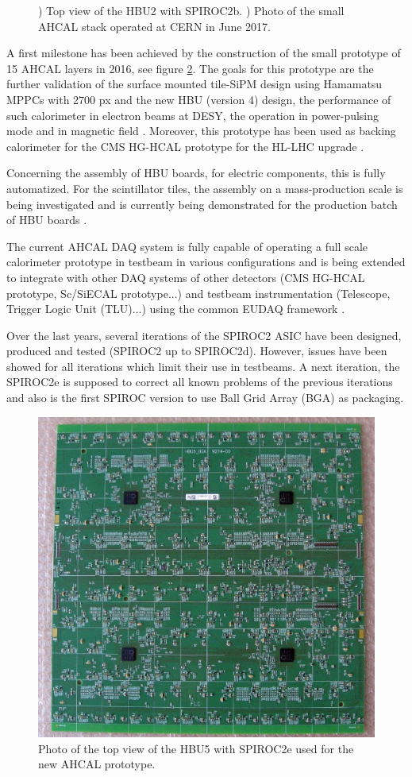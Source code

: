 \begin{figure}[htbp!]
\begin{subfigure}[t]{0.61\textwidth}
    \caption{} \label{fig:AHCALSmallStack}
  \end{subfigure}
  \caption{) Top view of the HBU2 with SPIROC2b. ) Photo of the small AHCAL stack operated at CERN in June 2017.}
\end{figure}

A first milestone has been achieved by the construction of the small prototype of 15 AHCAL layers in 2016, see figure \ref{fig:AHCALSmallStack}. The goals for this prototype are the further validation of the surface mounted tile-SiPM design using Hamamatsu MPPCs with 2700 px and the new HBU (version 4) design, the performance of such calorimeter in electron beams at DESY, the operation in power-pulsing mode and in magnetic field \cite{CR_IEEE2017}. Moreover, this prototype has been used as backing calorimeter for the CMS HG-HCAL prototype for the HL-LHC upgrade \cite{Felix:AHCALMain2017_HGHCAL}.

Concerning the assembly of HBU boards, for electric components, this is fully automatized. For the scintillator tiles, the assembly on a mass-production scale is being investigated and is currently being demonstrated for the production batch of HBU boards \cite{Phi:AHCALMain2017}.

The current AHCAL DAQ system is fully capable of operating a full scale calorimeter prototype in testbeam in various configurations and is being extended to integrate with other DAQ systems of other detectors (CMS HG-HCAL prototype, Sc/SiECAL prototype...) and testbeam instrumentation (Telescope, Trigger Logic Unit (TLU)...) using the common EUDAQ framework \cite{Kvasnicka:CR_IEEE2016, Kvasnicka:2017bpx, Wing:2296332}.

Over the last years, several iterations of the SPIROC2 ASIC have been designed, produced and tested (SPIROC2 up to SPIROC2d). However, issues have been showed for all iterations which limit their use in testbeams. A next iteration, the SPIROC2e is supposed to correct all known problems of the previous iterations and also is the first SPIROC version to use Ball Grid Array (BGA) as packaging.

\begin{figure}[htbp!]
  \centering
  \includegraphics[width=0.45\linewidth]{chap3/fig/HBU5_BGA.png}
  \caption{Photo of the top view of the HBU5 with SPIROC2e used for the new AHCAL prototype.} \label{fig:HBU5_BGA}
\end{figure}

